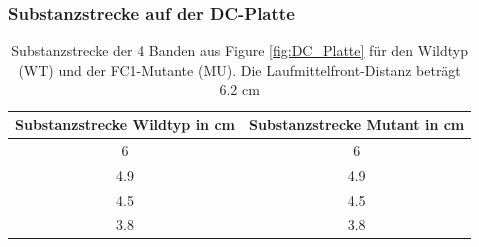 \documentclass[10pt,a4paper]{article}
\begin{document}
			\subsubsection{Substanzstrecke auf der DC-Platte}
				\begin{table}[H]
					\centering
					\caption{Substanzstrecke der 4 Banden aus Figure \ref{fig:DC_Platte} für den Wildtyp (WT) und der FC1-Mutante (MU). Die Laufmittelfront-Distanz beträgt 6.2 cm}
					\label{tab:Distance_Rf_Werte_Banden_Rohwerte}
					\begin{tabular}{cc}
						\toprule
						Substanzstrecke Wildtyp in cm& Substanzstrecke Mutant in cm\\
						\midrule
						6 & 6\\
						4.9 & 4.9\\
						4.5 & 4.5\\
						3.8 & 3.8\\
						\bottomrule
					\end{tabular}
				\end{table}


	
	
	\newpage
	
\end{document}

